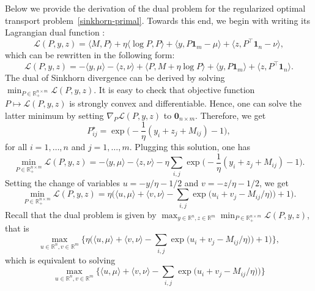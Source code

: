 \documentclass{article}
\newcommand{\inr}[1]{\langle #1 \rangle}
\newcommand{\R}{{\mathbb{R}}}
\begin{document}
Below we provide the derivation of the dual problem for the regularized optimal transport problem~\eqref{sinkhorn-primal}. Towards this end, we begin with writing its Lagrangian dual function :
\begin{equation*}
  \mathscr{L}(P,y, z) = \inr{M,P} + \eta \inr{\log P, P} + \inr{y, P\mathbf{1}_m - \mu} + \inr{z,P^\top \mathbf{1}_n - \nu},
\end{equation*}
which can be rewritten in the following form:
\begin{equation*}
  \mathscr{L}(P,y, z) = - \inr{y, \mu} - \inr{z, \nu} + \inr{P, M + \eta \log P} + \inr{y, P\mathbf{1}_m} + \inr{z, P^\top \mathbf{1}_n}.
\end{equation*}
The dual of Sinkhorn divergence can be derived by solving $\min_{P \in \R_+^{n\times m}}\mathscr{L}(P,y, z)$. It is easy to check that objective function $P\mapsto \mathscr{L}(P,y, z)$ is strongly convex and differentiable. Hence, one can solve the latter minimum by setting $\nabla_P \mathscr{L}(P,y, z)$ to $\mathbf{0}_{n\times m}$. Therefore, we get 
\begin{equation}
  P^\star_{ij} = \exp\Big(- \frac{1}{\eta} (y_i + z_j + M_{ij}) - 1\Big), 
\end{equation}
for all $i=1, \ldots, n$ and $j=1, \ldots, m$. Plugging this solution, one has 
\begin{equation*}
  \min_{P \in \R_+^{n\times m}}\mathscr{L}(P,y, z) = - \inr{y, \mu} - \inr{z, \nu} - \eta \sum_{i,j} \exp\Big(- \frac{1}{\eta} (y_i + z_j + M_{ij}) - 1\Big).
\end{equation*}
Setting the change of variables $u = -y/\eta - 1/2$ and $v = - z/\eta - 1/2$, we get 
\begin{equation*}
  \min_{P \in \R_+^{n\times m}}\mathscr{L}(P,y, z) = \eta \Big( \inr{u, \mu} + \inr{v, \nu} - \sum_{i,j} \exp\big(u_i + v_j - M_{ij}/\eta)\big) + 1\Big).
\end{equation*}
Recall that the dual problem is given by $\max_{y \in \R^n, z \in \R^m} \min_{P\in \R_+^{n\times m}}\mathscr{L}(P,y, z)$, that is 
\begin{equation*}
\max_{u \in \R^n, v\in\R^m} \Big\{\eta \Big(\inr{u, \mu} + \inr{v, \nu} - \sum_{i,j} \exp\big(u_i + v_j - M_{ij}/\eta)\big) + 1\Big)\Big\},
\end{equation*}
which is equivalent to solving 
\begin{equation*}
\max_{u \in \R^n, v\in\R^m} \Big\{\inr{u, \mu} + \inr{v, \nu} - \sum_{i,j} \exp\big(u_i + v_j - M_{ij}/\eta)\big) \Big\}
\end{equation*}
\end{document}
